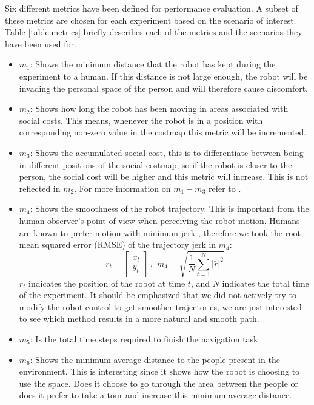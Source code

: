 Six different metrics have been defined for performance evaluation. A subset of these metrics are chosen for each experiment based on the scenario of interest. Table \ref{table:metrics} briefly describes each of the metrics and the scenarios they have been used for.



\begin{itemize}

\item $m_{1}$: Shows the minimum distance that the robot has kept during the experiment to a human. If this distance is not large enough, the robot will be invading the personal space of the person and will therefore cause discomfort. 


\item $m_{2}$: Shows how long the robot has been moving in areas associated with social costs. This means, whenever the robot is in a position with corresponding non-zero value in the costmap this metric will be incremented.

 \item $m_{3}$: Shows the accumulated social cost, this is to differentiate between being in different positions of the social costmap, so if the robot is closer to the person, the social cost will be higher and this metric will increase. This is not reflected in $m_{2}$. For more information on $m_{1}-m_{3}$ refer to \cite{talebpour2015board}. 

\item  $m_{4}$: Shows the smoothness of the robot trajectory. This is important from the human observer's point of view when perceiving the robot motion. Humans are known to prefer motion with minimum jerk \cite{sisbot2010synthesizing}, therefore we took the root mean squared error (RMSE) of the trajectory jerk in $m_{4}$:
\begin{equation}
r_{t} = \begin{bmatrix}
x_{t}\\
y_{t} 

\end{bmatrix} \, , \, \,  m_{4} = \sqrt{\frac{1}{N} \sum_{t=1}^{N}\left | \dddot{r} \right |^{2}  }
\end{equation}
$r_{t}$ indicates the position of the robot at time $t$, and $N$ indicates the total time of the experiment. It should be emphasized that we did not actively try to modify the robot control to get smoother trajectories, we are just interested to see which method results in a more natural and smooth path.  

\item $m_{5}$: Is the total time steps required to finish the navigation task.


\item $m_{6}$: Shows the minimum average distance to the people present in the environment. This is interesting since it shows how the robot is choosing to use the space. Does it choose to go through the area between the people or does it prefer to take a tour and increase this minimum average distance.

\end{itemize}

